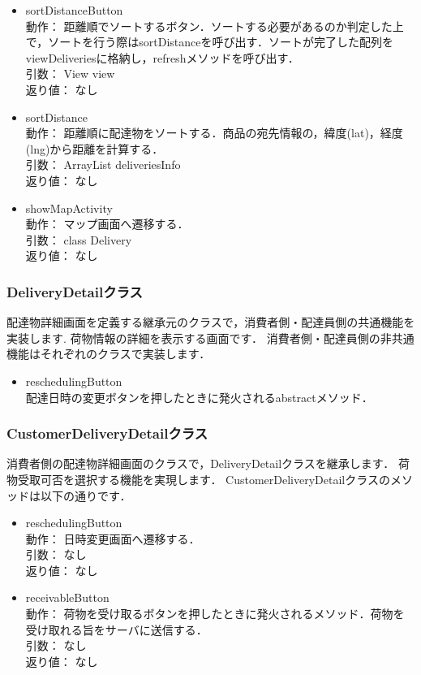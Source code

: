 \documentclass[a4j,titlepage]{jarticle}
\begin{document}
\begin{itemize}
  \item sortDistanceButton\\
  動作：  距離順でソートするボタン．ソートする必要があるのか判定した上で，ソートを行う際はsortDistanceを呼び出す．ソートが完了した配列をviewDeliveriesに格納し，refreshメソッドを呼び出す．\\
  引数：   View view\\
  返り値：  なし

  \item sortDistance\\
  動作：  距離順に配達物をソートする．商品の宛先情報の，緯度(lat)，経度(lng)から距離を計算する．\\
  引数：  ArrayList deliveriesInfo\\
  返り値：  なし

  \item showMapActivity\\
  動作：  マップ画面へ遷移する．\\
  引数：  class Delivery\\
  返り値：  なし
\end{itemize}

\subsubsection{DeliveryDetailクラス}
配達物詳細画面を定義する継承元のクラスで，消費者側・配達員側の共通機能を実装します.
荷物情報の詳細を表示する画面です．
 消費者側・配達員側の非共通機能はそれぞれのクラスで実装します．
 
\begin{itemize}
 \item reschedulingButton\\
 配達日時の変更ボタンを押したときに発火されるabstractメソッド．\\
\end{itemize}

\subsubsection{CustomerDeliveryDetailクラス}
消費者側の配達物詳細画面のクラスで，DeliveryDetailクラスを継承します．
荷物受取可否を選択する機能を実現します．
CustomerDeliveryDetailクラスのメソッドは以下の通りです．
\begin{itemize}
 \item reschedulingButton\\
 動作： 日時変更画面へ遷移する．\\
 引数： なし\\
 返り値： なし

 \item receivableButton\\
 動作： 荷物を受け取るボタンを押したときに発火されるメソッド．荷物を受け取れる旨をサーバに送信する．\\
 引数： なし\\
 返り値： なし
\end{itemize}
\end{document}
